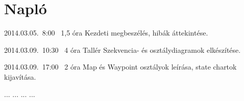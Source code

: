 %
\section{Napló}

\begin{naplo}


\bejegyzes
{2014.03.05.~8:00~} %
{1,5 óra} %
{\vadam\newline
\vantal\newline
\vbator\newline
\vtorok} %
{Kezdeti megbeszélés, hibák áttekintése.} %

\bejegyzes
{2014.03.09.~10:30~} %
{4 óra} %
{Tallér} %
{Szekvencia- és osztálydiagramok elkészítése.}

\bejegyzes
{2014.03.09.~17:00~}
{2 óra}
{\vadam}
{Map és Waypoint osztályok leírása, state chartok kijavítása.}

\bejegyzes
{...}
{...}
{...}
{...}


\end{naplo}

